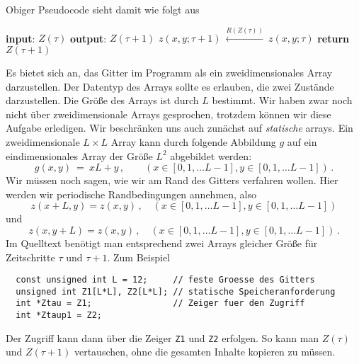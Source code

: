 \documentclass{article}[12pt]
\begin{document}
Obiger Pseudocode sieht damit wie folgt aus
\begin{algorithmic}[1]
  \State \textbf{input}: $Z(\tau)$
  \State \textbf{output}: $Z(\tau+1)$
  \State $z(x,y; \tau+1)\ \stackrel{R(Z(\tau))}{\longleftarrow}\ z(x,y; \tau)$
  \EndFor
  \EndFor
  \State \textbf{return} $Z(\tau+1)$
  \EndProcedure
\end{algorithmic}
Es bietet sich an, das Gitter im Programm als ein zweidimensionales Array darzustellen.
Der Datentyp des Arrays sollte es erlauben, die zwei Zustände darzustellen.
Die Größe des Arrays ist durch $L$ bestimmt.
Wir haben zwar noch nicht über zweidimensionale Arrays gesprochen, trotzdem können wir diese Aufgabe erledigen. 
Wir beschränken uns auch zunächst auf \emph{statische} arrays.
Ein zweidimensionale $L\times L$ Array kann durch folgende Abbildung $g$ auf ein eindimensionales Array der Größe $L^2$ abgebildet werden:
\begin{equation}
  g(x,y)\ =\ xL + y\,,\qquad (x\in[0,1,\ldots L-1], y\in[0,1,\ldots L-1])\,.
\end{equation}
Wir müssen noch sagen, wie wir am Rand des Gitters verfahren wollen.
Hier werden wir periodische Randbedingungen annehmen, also
\begin{equation}
  z(x+L,y)= z(x,y)\,,\quad (x\in[0,1,\ldots L-1], y\in[0,1,\ldots L-1])
\end{equation}
und
\begin{equation}
  z(x,y+L)= z(x, y)\,,\quad (x\in[0,1,\ldots L-1], y\in[0,1,\ldots L-1])\,.
\end{equation}
Im Quelltext benötigt man entsprechend zwei Arrays gleicher Größe für Zeitschritte $\tau$ und $\tau+1$.
Zum Beispiel
\begin{lstlisting}
  const unsigned int L = 12;     // feste Groesse des Gitters
  unsigned int Z1[L*L], Z2[L*L]; // statische Speicheranforderung
  int *Ztau = Z1;                // Zeiger fuer den Zugriff
  int *Ztaup1 = Z2;
\end{lstlisting}
Der Zugriff kann dann über die Zeiger \texttt{Z1} und \texttt{Z2} erfolgen.
So kann man $Z(\tau)$ und $Z(\tau+1)$ vertauschen, ohne die gesamten Inhalte kopieren zu müssen.
\end{document}
